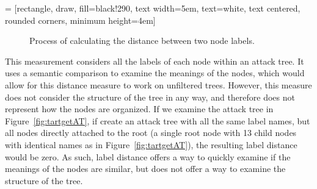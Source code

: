  = [rectangle, draw, fill=black!290,
text width=5em, text=white,  text centered, rounded corners, minimum height=4em]
\begin{figure}
    \caption{Process of calculating the distance between two node labels.}
    \label{fig:semanticreplacement}
\end{figure}

This measurement considers all the labels of each node within an attack tree. It uses a semantic comparison to examine the meanings of the nodes, which would allow for this distance measure to work on unfiltered trees. However, this measure does not consider the structure of the tree in any way, and therefore does not represent how the nodes are organized. If we examine the attack tree in Figure~\ref{fig:tartgetAT}, if create an attack tree with all the same label names, but all nodes directly attached to the root (a single root node with 13 child nodes with identical names as in Figure~\ref{fig:tartgetAT}), the resulting label distance would be zero. As such, label distance offers a way to quickly examine if the meanings of the nodes are similar, but does not offer a way to examine the structure of the tree. 

